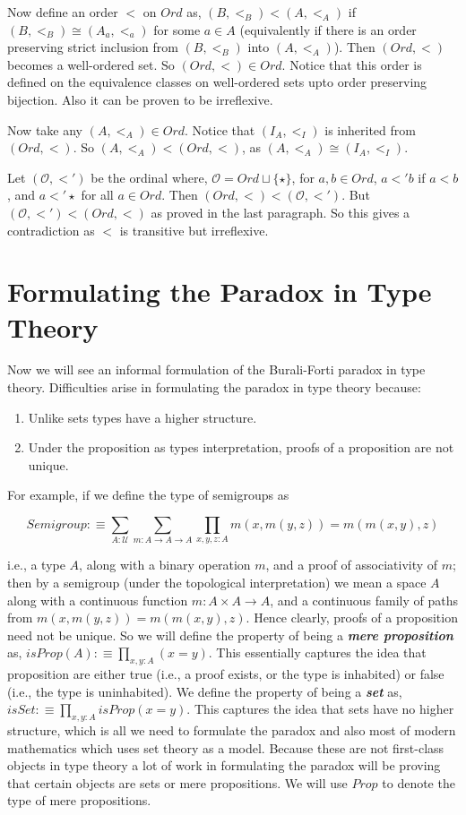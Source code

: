\documentclass[10pt]{article}
\theoremstyle{definition}
\theoremstyle{plain}
\theoremstyle{remark}
\newcommand{\U}{\mathscr{U}}
\begin{document}
Now define an order $<$ on $Ord$ as, $(B,<_B) < (A, <_A)$ if $(B, <_B) \cong (A_a, <_a)$ 
for some $a \in A$ (equivalently if there is an order preserving strict inclusion 
from $(B,<_B)$ into $(A,<_A)$). Then $(Ord, <)$ becomes a well-ordered set. 
So $(Ord, <) \in Ord$. Notice that this order is defined 
on the equivalence classes on well-ordered sets upto order preserving bijection. Also it can
be proven to be irreflexive.\smallskip

Now take any $(A, <_A)\in Ord$. Notice that $(I_A, <_I)$ is inherited from ${(Ord, <)}$. So
$(A, <_A) < (Ord, <)$, as $(A,<_A) \cong (I_A, <_I)$.\smallskip

Let $(\mathcal{O}, <')$ be the ordinal where, $\mathcal{O} = Ord\sqcup \{\star\}$, for 
$a,b\in Ord$, $a<'b$ if $a<b$, and $a<'\star$ for all $a\in Ord$. Then 
$(Ord,<)< (\mathcal{O},<')$. But $(\mathcal{O},<')<(Ord,<)$ as proved in the last paragraph.
So this gives a contradiction as $<$ is transitive but irreflexive. 

\section{Formulating the Paradox in Type Theory}\label{S:Form in TT}

Now we will see an informal formulation of the Burali-Forti paradox in type theory. 
Difficulties arise in formulating the paradox in type theory because:
\begin{enumerate}
\item Unlike sets types have a higher structure.
\item Under the proposition as types interpretation, proofs of a proposition are not unique.
\end{enumerate}

For example, if we define the type of semigroups as

\[ {Semigroup}:\equiv 	\sum_{A : \U} \sum_{m : A \to A \to A} 
    \prod_{x,y,z:A} m(x,m(y,z)) = m(m(x,y),z) \]
    
i.e., a type $A$, along with a binary operation $m$, and a proof of associativity of $m$; then
by a semigroup (under the topological interpretation) we mean a space $A$ along with a
continuous function $m : A\times A \to A$, and a continuous family of paths from 
$m(x,m(y,z)) = m(m(x,y),z)$. Hence clearly, proofs of a proposition need not be unique. So
we will define the property of being a \textbf{\textit{mere proposition}} as,
${ {isProp}(A) :\equiv \prod_{x,y : A} (x = y) }$. This essentially captures the idea
that proposition are either true (i.e., a proof exists, or the type is inhabited) or false 
(i.e., the type is uninhabited). We define the property of being a \textbf{\textit{set}} as, 
${ {isSet} :\equiv \prod_{x,y:A} {isProp}(x=y)  }$. This captures the idea that sets
have no higher structure, which is all we need to formulate the paradox and also most of
modern mathematics which uses set theory as a model. Because these are not first-class 
objects in type theory a lot of work in formulating the paradox will be proving that certain
objects are sets or mere propositions. We will use $Prop$ to denote the type of 
mere propositions.\smallskip
\end{document}
